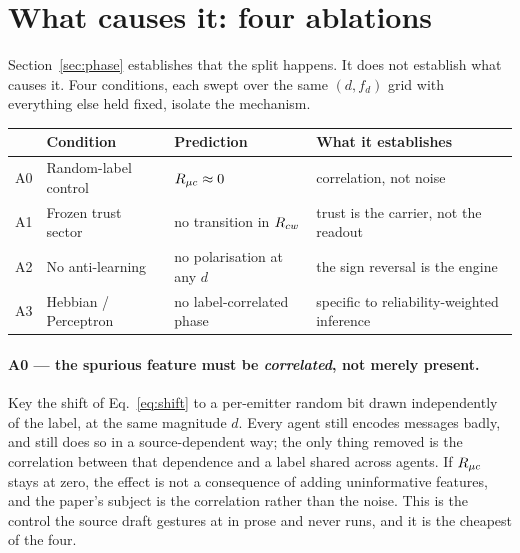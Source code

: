 \section{What causes it: four ablations}
\label{sec:ablation}


Section~\ref{sec:phase} establishes that the split happens. It does not establish
what causes it. Four conditions, each swept over the same $(d, f_d)$ grid with
everything else held fixed, isolate the mechanism.

\begin{table}[h]
  \centering
  \small
  \begin{tabular}{@{}llll@{}}
    \toprule
    & \textbf{Condition} & \textbf{Prediction} & \textbf{What it establishes} \\
    \midrule
    A0 & Random-label control     & $R_{\mu c} \approx 0$            & correlation, not noise \\
    A1 & Frozen trust sector      & no transition in $R_{cw}$     & trust is the carrier, not the readout \\
    A2 & No anti-learning         & no polarisation at any $d$  & the sign reversal is the engine \\
    A3 & Hebbian / Perceptron     & no label-correlated phase   & specific to reliability-weighted inference \\
    \bottomrule
  \end{tabular}
\end{table}

\paragraph{A0 --- the spurious feature must be \emph{correlated}, not merely
present.} Key the shift of Eq.~\ref{eq:shift} to a per-emitter random bit drawn
independently of the label, at the same magnitude $d$. Every agent still encodes
messages badly, and still does so in a source-dependent way; the only thing
removed is the correlation between that dependence and a label shared across
agents. If $R_{\mu c}$ stays at zero, the effect is not a consequence of adding
uninformative features, and the paper's subject is the correlation rather than
the noise. This is the control the source draft gestures at in prose and never
runs, and it is the cheapest of the four.

